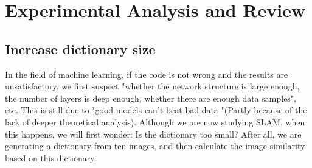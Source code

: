 \section{Experimental Analysis and Review}
\subsection{Increase dictionary size}
In the field of machine learning, if the code is not wrong and the results are unsatisfactory, we first suspect "whether the network structure is large enough, the number of layers is deep enough, whether there are enough data samples", etc. This is still due to "good models can't beat bad data "(Partly because of the lack of deeper theoretical analysis). Although we are now studying SLAM, when this happens, we will first wonder: Is the dictionary too small? After all, we are generating a dictionary from ten images, and then calculate the image similarity based on this dictionary.

